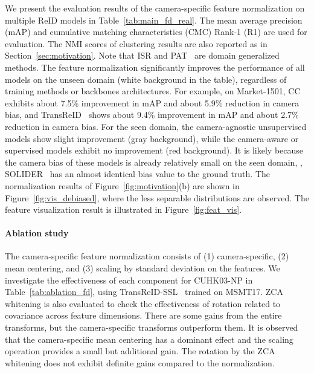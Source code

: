 We present the evaluation results of the camera-specific feature normalization on multiple ReID models in Table~\ref{tab:main_fd_real}.
The mean average precision (mAP) and cumulative matching characteristics (CMC) Rank-1 (R1) are used for evaluation.
The NMI scores of clustering results are also reported as in Section~\ref{sec:motivation}.
Note that ISR and PAT~\citep{pat} are domain generalized methods.
The feature normalization significantly improves the performance of all models on the unseen domain (white background in the table), regardless of training methods or backbones architectures.
For example, on Market-1501, CC~\citep{dai2022cluster} 
exhibits about 7.5\% improvement in mAP and about 5.9\% reduction in camera bias, and TransReID~\citep{he2021transreid} 
shows about 9.4\% improvement in mAP and about 2.7\% reduction in camera bias.
For the seen domain, the camera-agnostic unsupervised models show slight improvement (gray background), while the camera-aware or supervised models exhibit no improvement (red background).
It is likely because the camera bias of these models is already relatively small on the seen domain, \eg, SOLIDER~\citep{chen2023beyond} has an almost identical bias value to the ground truth.
The normalization results of Figure~\ref{fig:motivation}(b) are shown in Figure~\ref{fig:vis_debiased},
where the less separable distributions are observed.
The feature visualization result is illustrated in Figure~\ref{fig:feat_vis}.

\paragraph{Ablation study}
The camera-specific feature normalization consists of (1) camera-specific, (2) mean centering, and (3) scaling by standard deviation on the features.
We investigate the effectiveness of each component 
for CUHK03-NP in Table~\ref{tab:ablation_fd}, using TransReID-SSL~\citep{luo2021self} trained on MSMT17.
ZCA whitening is also evaluated to check the effectiveness of rotation related to covariance across feature dimensions.
There are some gains from the entire transforms, but the camera-specific transforms outperform them. 
It is observed that the camera-specific mean centering has a dominant effect and the scaling operation provides a small but additional gain.
The rotation by the ZCA whitening does not exhibit definite gains compared to the normalization.


